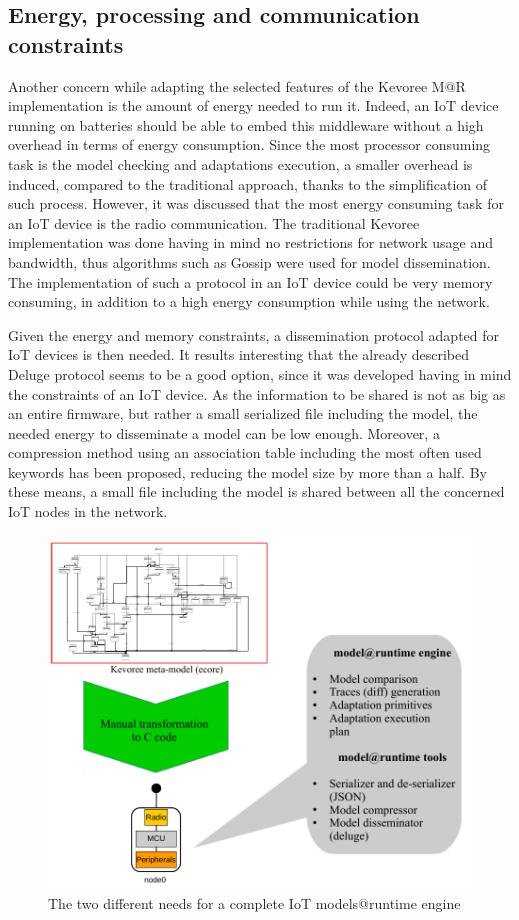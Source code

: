 \subsection{Energy, processing and communication constraints}
\label{subsec:ImplConstraints}
Another concern while adapting the selected features of the Kevoree M@R implementation is the amount of energy needed to run it.
Indeed, an IoT device running on batteries should be able to embed this middleware without a high overhead in terms of energy consumption.
Since the most processor consuming task is the model checking and adaptations execution, a smaller overhead is induced, compared to the traditional approach, thanks to the simplification of such process.
However, it was discussed that the most energy consuming task for an IoT device is the radio communication.
The traditional Kevoree implementation was done having in mind no restrictions for network usage and bandwidth, thus algorithms such as Gossip\cite{fouquet2012dissemination} were used for model dissemination.
The implementation of such a protocol in an IoT device could be very memory consuming, in addition to a high energy consumption while using the network.

Given the energy and memory constraints, a dissemination protocol adapted for IoT devices is then needed.
It results interesting that the already described Deluge protocol\cite{hui2004dynamic} seems to be a good option, since it was developed having in mind the constraints of an IoT device.
As the information to be shared is not as big as an entire firmware, but rather a small serialized file including the model, the needed energy to disseminate a model can be low enough.
Moreover, a compression method using an association table including the most often used keywords has been proposed, reducing the model size by more than a half.
By these means, a small file including the model is shared between all the concerned IoT nodes in the network.

\begin{figure}[]
	\centering
	\includegraphics[width=0.85\columnwidth]{chapters/modelsAtRuntimeContiki.images/Challenges.pdf}
	\caption{The two different needs for a complete IoT models@runtime engine}
	\label{fig:MAR_Challenges}
\end{figure}


